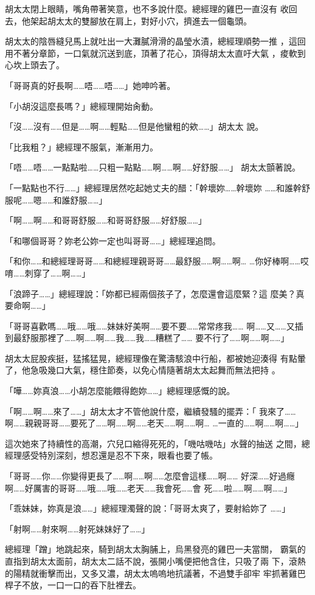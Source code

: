 胡太太閉上眼睛，嘴角帶著笑意，也不多說什麼。總經理的雞巴一直沒有
收回去，他架起胡太太的雙腳放在肩上，對好小穴，擠進去一個龜頭。

胡太太的陰唇縫兒馬上就吐出一大灘膩滑滑的晶瑩水漬，總經理順勢一推
，這回用不著分章節，一口氣就沉送到底，頂著了花心，頂得胡太太直吁大氣
，痠軟到心坎上頭去了。

「哥哥真的好長啊……唔……唔……」她呻吟著。

「小胡沒這麼長嗎？」總經理開始肏動。

「沒……沒有……但是……啊……輕點……但是他蠻粗的欸……」胡太太
說。

「比我粗？」總經理不服氣，漸漸用力。

「唔……唔……一點點啦……只粗一點點……啊……啊……好舒服……」
胡太太顫著說。

「一點點也不行……」總經理居然吃起她丈夫的醋：「幹壞妳……幹壞妳
……和誰幹舒服呢……嗯……和誰舒服……」

「啊……啊……和哥哥舒服……和哥哥舒服……好舒服……」

「和哪個哥哥？妳老公妳一定也叫哥哥……」總經理追問。

「和你……和總經理哥哥……和總經理親哥哥……最舒服……啊……啊…
…你好棒啊……哎唷……刺穿了……啊……」

「浪蹄子……」總經理說：「妳都已經兩個孩子了，怎麼還會這麼緊？這
麼美？真要命啊……」

「哥哥喜歡嗎……哦……哦……妹妹好美啊……要不要……常常疼我……
啊……又……又插到最舒服那裡了……啊……啊……我……我……糟糕了……
要不行了……啊……啊……」

胡太太屁股疾挺，猛搖猛晃，總經理像在驚濤駭浪中行船，都被她迎湊得
有點暈了，他急吸幾口大氣，穩住節奏，以免心情隨著胡太太起舞而無法把持
。

「嘩……妳真浪……小胡怎麼能餵得飽妳……」總經理感慨的說。

「啊……啊……來了……」胡太太才不管他說什麼，繼續發騷的擺弄：「
我來了……啊……親親哥哥……要死了……啊……啊……老天……啊……啊…
…一直的……啊……啊……」

這次她來了持續性的高潮，穴兒口縮得死死的，「嘰咕嘰咕」水聲的抽送
之間，總經理感受特別深刻，想忍還是忍不下來，眼看也要了帳。

「哥哥……你……你變得更長了……啊……啊……怎麼會這樣……啊……
好深……好過癮啊……好厲害的哥哥……哦……哦……老天……我會死……會
死……啦……啊……啊……」

「乖妹妹，妳真是浪……」總經理濁聲的說：「哥哥太爽了，要射給妳了
……」

「射啊……射來啊……射死妹妹好了……」

總經理「蹭」地跳起來，騎到胡太太胸脯上，烏黑發亮的雞巴一夫當關，
霸氣的直指到胡太太面前，胡太太二話不說，張開小嘴便把他含住，只吸了兩
下，滾熱的陽精就衝擊而出，又多又濃，胡太太嗚嗚地抗議著，不過雙手卻牢
牢抓著雞巴桿子不放，一口一口的吞下肚裡去。

